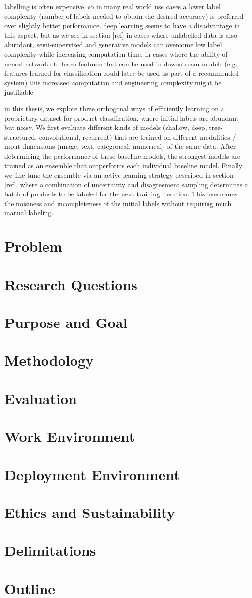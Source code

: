 labelling is often expensive, so in many real world use cases a lower label complexity (number of labels needed to obtain the desired accuracy) is preferred over slightly better performance.
deep learning seems to have a disadvantage in this aspect, but as we see in section [ref] in cases where unlabelled data is also abundant, semi-supervised and generative models can overcome low label complexity while increasing computation time.
in cases where the ability of neural networks to learn features that can be used in downstream models (e.g. features learned for classification could later be used as part of a recommended system) this increased computation and engineering complexity might be justifiable

in this thesis, we explore three orthogonal ways of efficiently learning on a proprietary dataset for product classification, where initial labels are abundant but noisy. We first evaluate different kinds of models (shallow, deep, tree-structured, convolutional, recurrent) that are trained on different modalities / input dimensions (image, text, categorical, numerical) of the same data. After determining the performance of these baseline models, the strongest models are trained as an ensemble that outperforms each individual baseline model. Finally we fine-tune the ensemble via an active learning strategy described in section [ref], where a combination of uncertainty and disagreement sampling determines a batch of products to be labeled for the next training iteration. This overcomes the noisiness and incompleteness of the initial labels without requiring much manual labeling.

\section{Problem}
\section{Research Questions}
\section{Purpose and Goal}
\section{Methodology}
\section{Evaluation}
\section{Work Environment}
\section{Deployment Environment}
\section{Ethics and Sustainability}
\section{Delimitations}
\section{Outline}
